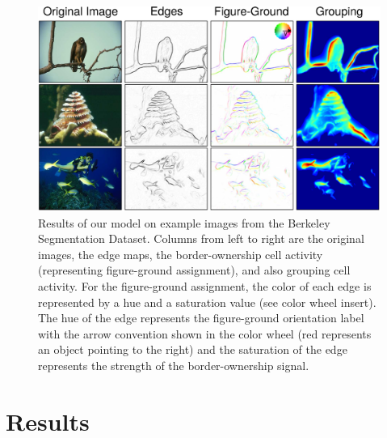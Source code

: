 \begin{figure}[t!]
\centering
\includegraphics[width=\textwidth]{NaturalImage/figs/results_new}
\makeatletter
\let\@currsize\normalsize
\caption[Model results on images from the BSDS dataset]{Results of our model on example images from the Berkeley Segmentation Dataset. Columns from left to right are the original images, the edge maps, the border-ownership cell activity (representing figure-ground assignment), and also grouping cell activity. For the figure-ground assignment, the color of each edge is represented by a hue and a saturation value (see color wheel insert). The hue of the edge represents the figure-ground orientation label with the arrow convention shown in the color wheel (\eg red represents an object pointing to the right) and the saturation of the edge represents the strength of the border-ownership signal.}
\label{Fig:results_summary}
\end{figure}


\section{Results}
\label{sec:results}

